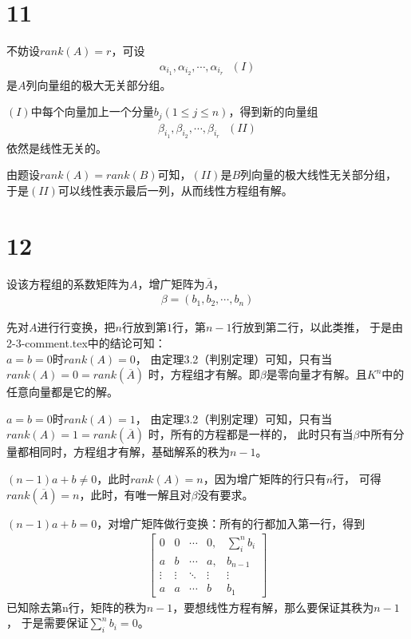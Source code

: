 \documentclass{article}
\begin{document}
\section*{11}

不妨设$rank(A) = r$，可设
\begin{align*}
  \alpha_{i_1}, \alpha_{i_2}, \cdots, \alpha_{i_r} \ \ \ (I)
\end{align*}
是$A$列向量组的极大无关部分组。

$(I)$中每个向量加上一个分量$b_j (1 \leq j \leq n)$，得到新的向量组
\begin{align*}
  \beta_{i_1}, \beta_{i_2}, \cdots, \beta_{i_r} \ \ \ (II)
\end{align*}
依然是线性无关的。

由题设$rank(A) = rank(B)$可知，$(II)$是$B$列向量的极大线性无关部分组，
于是$(II)$可以线性表示最后一列，从而线性方程组有解。

\section*{12}

设该方程组的系数矩阵为$A$，增广矩阵为$\overline{A}$，
\begin{align*}
  \beta = (b_1, b_2, \cdots, b_n)
\end{align*}

先对$A$进行行变换，把$n$行放到第$1$行，第$n-1$行放到第二行，以此类推，
于是由2-3-comment.tex中的结论可知：\\
$a = b = 0$时$rank(A) = 0$，
由定理3.2（判别定理）可知，只有当$rank(A) = 0 = rank(\overline{A})$
时，方程组才有解。即$\beta$是零向量才有解。且$K^n$中的任意向量都是它的解。

$a = b = 0$时$rank(A) = 1$，
由定理3.2（判别定理）可知，只有当$rank(A) = 1 = rank(\overline{A})$
时，所有的方程都是一样的，
此时只有当$\beta$中所有分量都相同时，方程组才有解，基础解系的秩为$n - 1$。

$(n - 1)a + b \neq 0$，此时$rank(A) = n$，因为增广矩阵的行只有$n$行，
可得$rank(\overline{A}) = n$，此时，有唯一解且对$\beta$没有要求。

$(n - 1)a + b = 0$，对增广矩阵做行变换：所有的行都加入第一行，得到
\begin{align*}
  \begin{bmatrix}
    0      & 0      & \cdots & 0,     & \sum\limits_{i}^n b_i \\
    a      & b      & \cdots & a,     & b_{n - 1}             \\
    \vdots & \vdots & \ddots & \vdots & \vdots                \\
    a      & a      & \cdots & b      & b_1
  \end{bmatrix}
\end{align*}
已知除去第n行，矩阵的秩为$n - 1$，要想线性方程有解，那么要保证其秩为$n - 1$，
于是需要保证$\sum\limits_{i}^n b_i = 0$。
\end{document}
